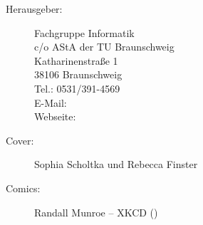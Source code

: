 
\begin{description}
\item[Herausgeber:]
	Fachgruppe Informatik\\
	c/o AStA der TU Braunschweig\\
	Katharinenstraße 1\\
	38106 Braunschweig\\
	Tel.: 0531/391-4569\\
	E-Mail: \\
	Webseite: \fginfoUrl
{}
\item[Cover:] Sophia Scholtka und Rebecca Finster
\item[Comics:] Randall Munroe -- XKCD ()
\end{description}
